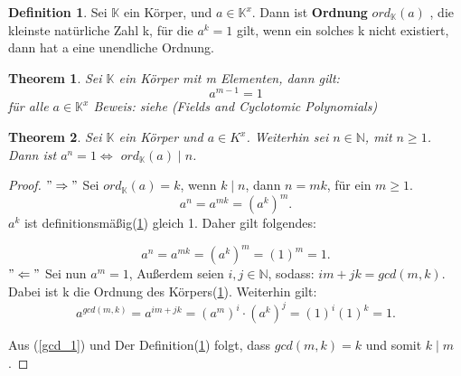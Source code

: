 \documentclass[12pt,oneside]{article}
\newtheorem{theorem}{Theorem}[section]
\theoremstyle{remark}
\theoremstyle{definition}
\newtheorem{definition}{Definition}[section]
\begin{document}
\smallskip

\begin{definition}\label{ord_def}
Sei $\mathbb{K}$ ein Körper, und $a \in \mathbb{K}^x$. Dann ist \textbf{Ordnung} $ ord_{ \mathbb{K} }(a)$ , die kleinste natürliche Zahl k, für die $a^k = 1 $ gilt, wenn ein solches k nicht existiert, dann hat a eine unendliche Ordnung. 
\end{definition}

\smallskip

\begin{theorem}
Sei $\mathbb{K}$ ein Körper mit m Elementen, dann gilt:
\begin{equation}
    a^{m-1} = 1
\end{equation}
für alle $a \in \mathbb{K}^x$\newline
Beweis: siehe (Fields and Cyclotomic Polynomials) 
\end{theorem}

\smallskip

\begin{theorem}
Sei $\mathbb{K}$ ein Körper und $a \in K^x$. Weiterhin sei $ n \in \mathbb{N}$, mit $n \geq 1$. Dann ist $a^n = 1 \Leftrightarrow	 $ $ord_{\mathbb{K}}(a) \mid n$. 
\end{theorem}

\smallskip

\begin{proof}
$"\Rightarrow"$\newline
Sei $ord_{\mathbb{K}}(a) = k $, wenn $k \mid n$, dann $n = mk$, für ein $ m \geq 1$.
\begin{equation}
    a^n = a^{mk} = (a^k)^m. 
\end{equation}
$a^k$ ist definitionsmäßig(\ref{ord_def}) gleich 1. Daher gilt folgendes:

\begin{equation}
    a^n = a^{mk} = (a^k)^m = (1)^m = 1.
\end{equation}
$"\Leftarrow"$\newline
Sei nun $a^m = 1$, Außerdem seien $i,j \in \mathbb{N}$, sodass:\newline
$im + jk = gcd(m,k)$. Dabei ist k die Ordnung des Körpers(\ref{ord_def}).\newline\newline
Weiterhin gilt: 
\begin{equation}\label{gcd_1}
   a^{gcd(m,k)} = a^{im + jk} = (a^m)^i \cdot (a^k)^j = (1)^i (1)^k = 1.
\end{equation}

Aus (\ref{gcd_1}) und Der Definition(\ref{ord_def}) folgt, dass $gcd(m,k) = k$ und somit $k \mid m$.
\end{proof}
\end{document}
